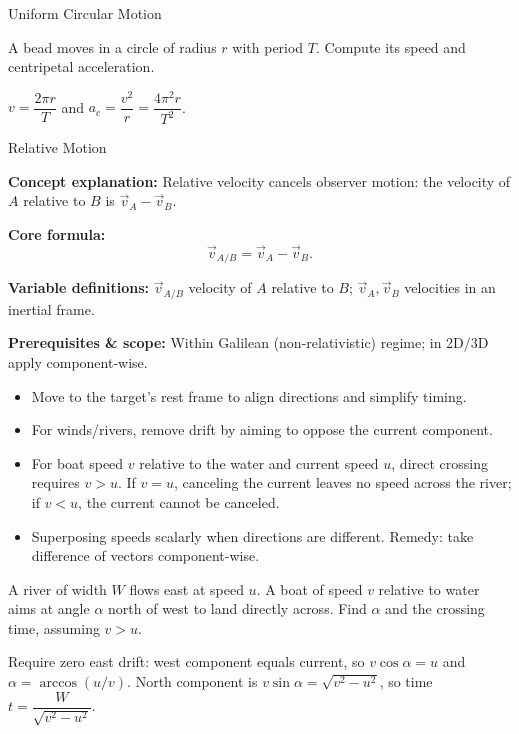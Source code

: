 \begin{KnowledgePoint}{Uniform Circular Motion \Core}
  \KPProblems
  \begin{cheatproblem}
  A bead moves in a circle of radius $r$ with period $T$. Compute its speed and centripetal acceleration.
  \begin{solutionbox}
  $v=\dfrac{2\pi r}{T}$ and $a_c=\dfrac{v^2}{r}=\dfrac{4\pi^2 r}{T^2}$.
  \end{solutionbox}
  \end{cheatproblem}
\end{KnowledgePoint}

\begin{KnowledgePoint}{Relative Motion \Core}
  \KPFormulas
  \begin{formulabox}
  \textbf{Concept explanation:} Relative velocity cancels observer motion: the velocity of $A$ relative to $B$ is $\vec v_A-\vec v_B$.

  \textbf{Core formula:}
  \[
  \vec v_{A/B}=\vec v_A-\vec v_B.
  \]

  \textbf{Variable definitions:} $\vec v_{A/B}$ velocity of $A$ relative to $B$; $\vec v_A,\vec v_B$ velocities in an inertial frame.

  \textbf{Prerequisites \& scope:} Within Galilean (non-relativistic) regime; in 2D/3D apply component-wise.
  \end{formulabox}

  \KPHeuristics
  \begin{heuristicsbox}
  \begin{itemize}[leftmargin=*]
    \item Move to the target's rest frame to align directions and simplify timing.
    \item For winds/rivers, remove drift by aiming to oppose the current component.
    \item For boat speed $v$ relative to the water and current speed $u$, direct crossing requires $v>u$. If $v=u$, canceling the current leaves no speed across the river; if $v<u$, the current cannot be canceled.
  \end{itemize}
  \vspace{0.4em}
  \begin{itemize}[leftmargin=*]
    \item Superposing speeds scalarly when directions are different. Remedy: take difference of vectors component-wise.
  \end{itemize}
  \end{heuristicsbox}

  \KPProblems
  \begin{cheatproblem}
  A river of width $W$ flows east at speed $u$. A boat of speed $v$ relative to water aims at angle $\alpha$ north of west to land directly across. Find $\alpha$ and the crossing time, assuming $v>u$.
  \begin{solutionbox}
  Require zero east drift: west component equals current, so $v\cos\alpha=u$ and $\alpha=\arccos(u/v)$. North component is $v\sin\alpha=\sqrt{v^2-u^2}$, so time $t=\dfrac{W}{\sqrt{v^2-u^2}}$.
  \end{solutionbox}
  \end{cheatproblem}
\end{KnowledgePoint}

